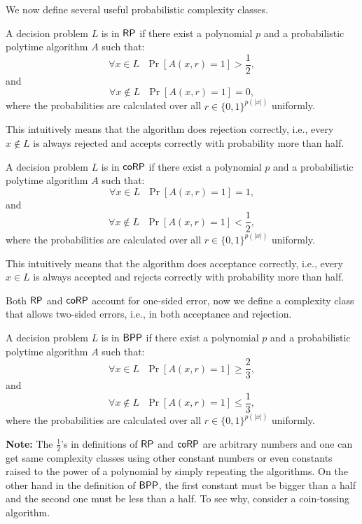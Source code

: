 We now define several useful probabilistic complexity classes.

\begin{definition} \label{rpdef}
A decision problem $L$ is in $\mathsf{RP}$ if there exist a polynomial $p$ and a probabilistic polytime algorithm $A$ such that:
$$\forall x \in L ~~~ \Pr[A(x, r) = 1] > \frac{1}{2},$$ and $$\forall x \not \in L ~~~ \Pr[A(x, r) = 1] = 0,$$
where the probabilities are calculated over all $r \in \{0, 1\}^{p(\vert x \vert)}$ uniformly.

This intuitively means that the algorithm does rejection correctly, i.e., every $x \not \in L$ is always rejected and accepts correctly with probability more than half.
\end{definition}

\begin{definition}[$\cc{coRP}$] \label{corpdef}
A decision problem $L$ is in $\cc{coRP}$ if there exist a polynomial $p$ and a probabilistic polytime algorithm $A$ such that:
$$\forall x \in L ~~~ \Pr[A(x, r) = 1] = 1,$$ and $$\forall x \not \in L ~~~ \Pr[A(x, r) = 1] < \frac{1}{2},$$
where the probabilities are calculated over all $r \in \{0, 1\}^{p(\vert x \vert)}$ uniformly.

This intuitively means that the algorithm does acceptance correctly, i.e., every $x \in L$ is always accepted and rejects correctly with probability more than half.
\end{definition}

Both $\mathsf{RP}$ and $\cc{coRP}$ account for one-sided error, now we define a complexity class that allows two-sided errors, i.e., in both acceptance and rejection.

\begin{definition} 
A decision problem $L$ is in $\mathsf{BPP}$ if there exist a polynomial $p$ and a probabilistic polytime algorithm $A$ such that:
$$\forall x \in L ~~~ \Pr[A(x, r) = 1] \geq \frac{2}{3},$$ and $$\forall x \not \in L ~~~ \Pr[A(x, r) = 1] \leq \frac{1}{3},$$
where the probabilities are calculated over all $r \in \{0, 1\}^{p(\vert x \vert)}$ uniformly.
\end{definition}

\textbf{Note:} The $\frac{1}{2}$'s in definitions of $\mathsf{RP}$ and $\cc{coRP}$ are arbitrary numbers and one can get same complexity classes using other constant numbers or even constants raised to the power of a polynomial by simply repeating the algorithms. On the other hand in the definition of $\mathsf{BPP}$, the first constant must be bigger than a half and the second one must be less than a half. To see why, consider a coin-tossing algorithm.


